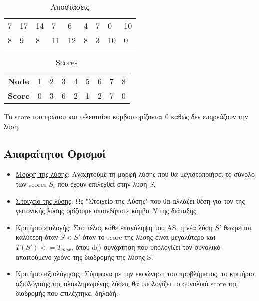 \documentclass[12pt, a4paper]{article}
\begin{document}
\begin{table}[H]
\begin{tabular}{lllllllll}
\multicolumn{1}{l|}{7} & \multicolumn{1}{l|}{17} & \multicolumn{1}{l|}{14} & \multicolumn{1}{l|}{7}  & \multicolumn{1}{l|}{6}  & \multicolumn{1}{l|}{4}  & \multicolumn{1}{l|}{7}  & \multicolumn{1}{l|}{0}  & \multicolumn{1}{l|}{10} \\ \cline{2-9} 
\multicolumn{1}{l|}{8} & \multicolumn{1}{l|}{9}  & \multicolumn{1}{l|}{8}  & \multicolumn{1}{l|}{11} & \multicolumn{1}{l|}{12} & \multicolumn{1}{l|}{8}  & \multicolumn{1}{l|}{3}  & \multicolumn{1}{l|}{10} & \multicolumn{1}{l|}{0}  \\ \cline{2-9} 
\end{tabular}
\caption{Αποστάσεις}
\label{my-label}
\end{table}


\begin{table}[H]
\centering
\begin{tabular}{l|l|l|l|l|l|l|l|l|}
\cline{2-9}
\textbf{Node}  & 1 & 2 & 3 & 4 & 5 & 6 & 7 & 8 \\ \cline{2-9} 
\textbf{Score} & 0 & 3 & 6 & 2 & 1 & 2 & 7 & 0 \\ \cline{2-9} 
\end{tabular}
\caption{Scores}
\label{my-label}
\end{table}

Τα score του πρώτου και τελευταίου κόμβου ορίζονται 0 καθώς δεν επηρεάζουν την λύση.

\subsection{Απαραίτητοι Ορισμοί}

\begin{itemize}

\item \underline{Μορφή της λύσης}: Αναζητούμε τη μορφή λύσης που θα μεγιστοποιήσει το σύνολο των scores \(S_i\) που έχουν επιλεχθεί στην λύση \(S\).
\item \underline{Στοιχείο της λύσης}: Ως "Στοιχείο της Λύσης" που θα αλλάζει θέση για τον της γειτονικής λύσης ορίζουμε οποινδήποτε κόμβο \(N\) της διάταξης.
\item \underline{Κριτήριο επιλογής}: Στο τέλος κάθε επανάληψη του AS,  η νέα λύση \(S'\) θεωρείται καλύτερη όταν \(S < S'\) όταν το score της λύσης είναι μεγαλύτερο και \(T(S') <= T_{max}\), όπου d() συνάρτηση που υπολογίζει τον συνολικό απαιτούμενο χρόνο της διαδρομής της λύσης S'.
\item \underline{Κριτήριο αξιολόγησης}: Σύμφωνα με την εκφώνηση του προβλήματος, το κριτήριο αξιολόγισης της ολοκληρωμένης λύσεις θα υπολογίζει το συνολικό score της διαδρομής που επιλέχτηκε, δηλαδή:

\end{itemize}
\end{document}
